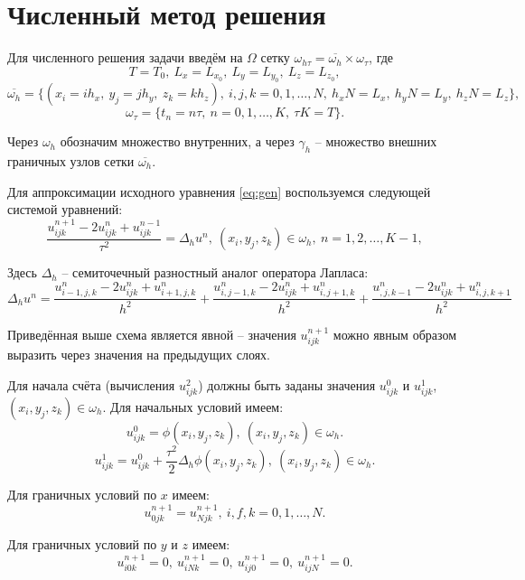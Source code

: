 \section{Численный метод решения}
\label{sec:CSolution} 

Для численного решения задачи введём на $\Omega$ сетку $\omega_{h\tau} = \overline{\omega_h} \times \omega_\tau$, где
$$
T = T_0,\ L_x = L_{x_0},\ L_y = L_{y_0},\ L_z = L_{z_0},
$$
$$
\overline{\omega_h} = \{ (x_i = i h_x,\ y_j = j h_y,\ z_k = k h_z ),\ i,j,k = 0,1,\dotsc,N,\ h_x N = L_x,\ h_y N = L_y,\ h_z N = L_z \},
$$
$$
\omega_\tau = \{ t_n = n\tau,\ n = 0,1,\dotsc,K,\ \tau K = T \}.
$$

Через $\omega_h$ обозначим множество внутренних, а через $\gamma_h$ -- множество внешних граничных узлов сетки $\overline{\omega_h}$.

Для аппроксимации исходного уравнения \ref{eq:gen} воспользуемся следующей системой уравнений:
$$
\frac{u_{ijk}^{n+1} - 2u_{ijk}^{n} + u_{ijk}^{n-1}}{\tau^2} = \Delta_h u^n,\ (x_i,y_j,z_k) \in \omega_h,\ n = 1,2,\dotsc, K-1,
$$

Здесь $\Delta_h$ -- семиточечный разностный аналог оператора Лапласа:
$$
\Delta_h u^n = \frac{u_{i-1,j,k}^n - 2u_{ijk}^n + u_{i+1,j,k}^n}{h^2} + \frac{u_{i,j-1,k}^n - 2u_{ijk}^n + u_{i,j+1,k}^n}{h^2} + \frac{u_{,j,k-1}^n - 2u_{ijk}^n + u_{i,j,k+1}^n}{h^2}
$$

Приведённая выше схема является явной -- значения $u_{ijk}^{n+1}$ можно явным образом выразить через значения на предыдущих слоях.

Для начала счёта (вычисления $u_{ijk}^2$) должны быть заданы значения $u_{ijk}^0$ и $u_{ijk}^1$, $(x_i,y_j,z_k) \in \omega_h$.
Для начальных условий имеем:
$$
u_{ijk}^0 = \phi(x_i,y_j,z_k),\ (x_i,y_j,z_k) \in \omega_h.
$$
$$
u_{ijk}^1 = u_{ijk}^0 + \frac{\tau^2}{2} \Delta_h \phi(x_i,y_j,z_k),\ (x_i,y_j,z_k) \in \omega_h.
$$

Для граничных условий по $x$ имеем:
$$
u_{0jk}^{n+1} = u_{Njk}^{n+1},\ i,f,k = 0,1,\dotsc,N.
$$

Для граничных условий по $y$ и $z$ имеем:
$$
u_{i0k}^{n+1} = 0,\ u_{iNk}^{n+1} = 0,\ u_{ij0}^{n+1} = 0,\ u_{ijN}^{n+1} = 0.
$$